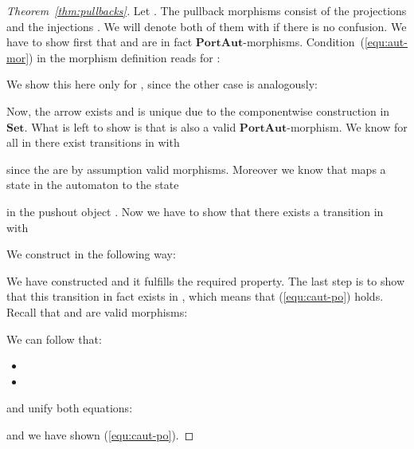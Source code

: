 \documentclass[copyright,creativecommons]{eptcs}
\newcommand{\Set}{\ensuremath{\mathbf{Set}}}
\newcommand{\PA}{\ensuremath{\mathbf{PortAut}}}
\begin{document}
\begin{proof}[Theorem~\ref{thm:pullbacks}]
Let . The pullback morphisms  consist of
the projections  and the injections . We will denote both of them with  if there is no confusion. We have
to show first that  and  are in fact \PA-morphisms.
Condition~(\ref{equ:aut-mor}) in the morphism definition reads for :  

We show this here only for , since the other case is analogously:
\vspace{3mm}\\

\vspace{-3mm}
\setlength{\extrarowheight}{2mm}

Now, the arrow  exists and is unique due to the componentwise construction in \Set. What is left
to show is that  is also a valid \PA-morphism.
We know for all  in 
there exist transitions  in  with

since the  are by assumption valid morphisms. Moreover we know that  maps
a state  in the automaton  to the state

in the pushout object . Now we have to show that there exists a transition 
 in  with 

We construct  in the following way:

We have constructed  and it fulfills the required property.
The last step is to show that this transition in fact exists in , which means that 
(\ref{equ:caut-po}) holds. Recall that  and  are valid morphisms:

We can follow that:
\begin{itemize}
\item 
\item 
\end{itemize}
and unify both equations:

and we have shown (\ref{equ:caut-po}).
\end{proof}
 
\end{document}
